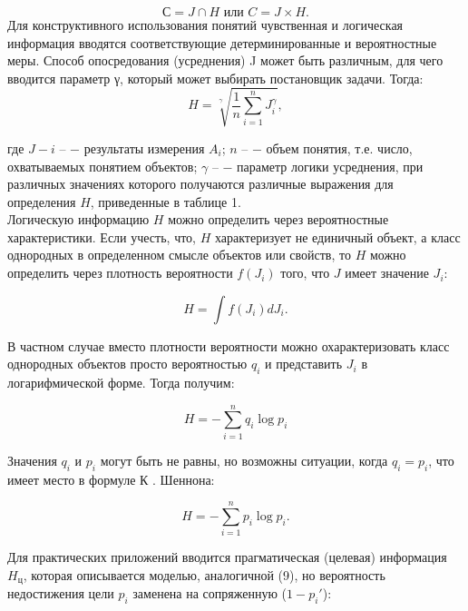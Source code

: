 \documentclass[a4paper,12pt]{report}
\begin{document}
	\begin{equation}
\label{trivial}
 С = J \cap  H \mbox{ или } C = J \times H.		
\end{equation}						
	Для конструктивного использования понятий чувственная и логическая информация вводятся соответствующие детерминированные и вероятностные меры. Способ опосредования (усреднения) J может быть различным, для чего вводится параметр γ, который может выбирать постановщик задачи. Тогда:
	\begin{equation}
\label{trivial}
 H = \sqrt[ \gamma ]{ \frac{1}{n} \sum_{i = 1}^n J_i^\gamma}  , 
\end{equation}										 

где $J-i \mbox{ –}$ − результаты измерения $A_i$; $n \mbox{ –}$ − объем понятия, т.е. число, охватываемых понятием объектов; $\gamma \mbox{ –}$ − параметр логики усреднения, при различных значениях которого получаются различные выражения для определения $H$, приведенные в таблице 1.\\
	Логическую информацию $H$ можно определить через вероятностные характеристики. Если учесть, что, $H$ характеризует не единичный объект, а класс однородных в определенном смысле объектов или свойств, то $H$ можно определить через плотность вероятности $f(J_i)$ того, что $J$ имеет значение $J_i$:

	\begin{equation}
\label{trivial}
H = \int f( J_i)dJ_i  .
\end{equation} 										

	В частном случае вместо плотности вероятности можно охарактеризовать класс однородных объектов просто вероятностью $q_i$ и представить $J_i$ в логарифмической форме. Тогда получим:

	\begin{equation}
\label{trivial}
H =  -\sum_{i = 1}^{n}q_i \log p_i
\end{equation} 

Значения $q_i$ и $p_i$ могут быть не равны, но возможны ситуации, когда $q_i = p_i$, что имеет место в формуле К . Шеннона:

	\begin{equation}
\label{trivial}
H =  -\sum_{i = 1}^{n}p_i \log p_i.
\end{equation} 									      

	Для практических приложений вводится прагматическая (целевая) информация $H_ц$, которая описывается моделью, аналогичной (9), но вероятность недостижения цели $p_i$ заменена на сопряженную ($1 - p_i'$):
\end{document}
